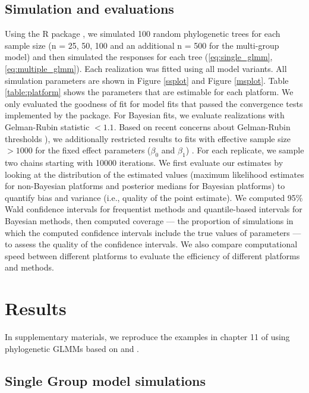 \documentclass[12pt]{article}
\begin{document}
\subsection*{Simulation and evaluations}

Using the R package  \citep{ape}, we simulated 100 random phylogenetic trees  for each sample size (n = 25, 50, 100 and an additional n = 500 for the multi-group model) and then simulated the responses for each tree (\ref{eq:single_glmm}, \ref{eq:multiple_glmm}). 
Each realization was fitted using all model variants. 
All simulation parameters are shown in Figure \ref{ssplot} and Figure \ref{msplot}. 
Table \ref{table:platform} shows the parameters that are estimable for each platform. 
We only evaluated the goodness of fit for model fits that passed the convergence tests implemented by the package.
For Bayesian fits, we evaluate realizations with Gelman-Rubin statistic $<1.1$. Based on recent concerns about Gelman-Rubin thresholds \citep{vats2018revisiting}), we additionally restricted results to fits with  effective sample size $>1000$ for the fixed effect parameters ($\beta_{0}$ and $\beta_{1}$) \citep{vehtari2019rank}. 
For each replicate, we sample two chains starting with 10000 iterations. 
We first evaluate our estimates by looking at the distribution of the estimated values (maximum likelihood estimates for non-Bayesian platforms and posterior medians for Bayesian platforms) to quantify bias and variance (i.e., quality of the point estimate).
We computed 95\% Wald confidence intervals for frequentist methods and quantile-based intervals for Bayesian methods, then computed coverage --- the proportion of simulations in which the computed confidence intervals include the true values of parameters --- to assess the quality of the confidence intervals.
We also compare computational speed between different platforms to evaluate the efficiency of different platforms and methods. 

\section*{Results}

In supplementary materials, we reproduce the examples in chapter 11 of \cite{garamszegi2014modern} using phylogenetic GLMMs based on  and .

\subsection*{Single Group model simulations}
\end{document}
